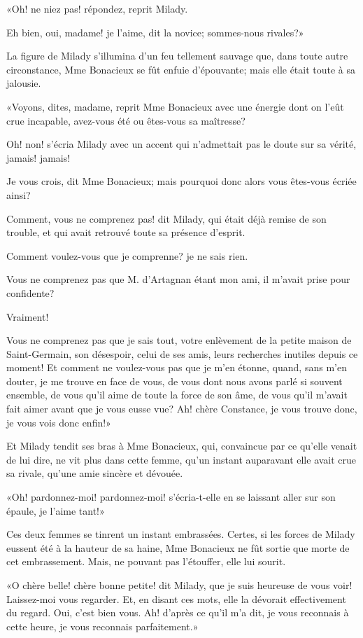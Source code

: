 «Oh! ne niez pas! répondez, reprit Milady. 

\speak  Eh bien, oui, madame! je l'aime, dit la novice; sommes-nous rivales?» 

La figure de Milady s'illumina d'un feu tellement sauvage que, dans toute autre circonstance, Mme Bonacieux se fût enfuie d'épouvante; mais elle était toute à sa jalousie. 

«Voyons, dites, madame, reprit Mme Bonacieux avec une énergie dont on l'eût crue incapable, avez-vous été ou êtes-vous sa maîtresse? 

\speak  Oh! non! s'écria Milady avec un accent qui n'admettait pas le doute sur sa vérité, jamais! jamais! 

\speak  Je vous crois, dit Mme Bonacieux; mais pourquoi donc alors vous êtes-vous écriée ainsi? 

\speak  Comment, vous ne comprenez pas! dit Milady, qui était déjà remise de son trouble, et qui avait retrouvé toute sa présence d'esprit. 

\speak  Comment voulez-vous que je comprenne? je ne sais rien. 

\speak  Vous ne comprenez pas que M. d'Artagnan étant mon ami, il m'avait prise pour confidente? 

\speak  Vraiment! 

\speak  Vous ne comprenez pas que je sais tout, votre enlèvement de la petite maison de Saint-Germain, son désespoir, celui de ses amis, leurs recherches inutiles depuis ce moment! Et comment ne voulez-vous pas que je m'en étonne, quand, sans m'en douter, je me trouve en face de vous, de vous dont nous avons parlé si souvent ensemble, de vous qu'il aime de toute la force de son âme, de vous qu'il m'avait fait aimer avant que je vous eusse vue? Ah! chère Constance, je vous trouve donc, je vous vois donc enfin!» 

Et Milady tendit ses bras à Mme Bonacieux, qui, convaincue par ce qu'elle venait de lui dire, ne vit plus dans cette femme, qu'un instant auparavant elle avait crue sa rivale, qu'une amie sincère et dévouée. 

«Oh! pardonnez-moi! pardonnez-moi! s'écria-t-elle en se laissant aller sur son épaule, je l'aime tant!» 

Ces deux femmes se tinrent un instant embrassées. Certes, si les forces de Milady eussent été à la hauteur de sa haine, Mme Bonacieux ne fût sortie que morte de cet embrassement. Mais, ne pouvant pas l'étouffer, elle lui sourit. 

«O chère belle! chère bonne petite! dit Milady, que je suis heureuse de vous voir! Laissez-moi vous regarder. Et, en disant ces mots, elle la dévorait effectivement du regard. Oui, c'est bien vous. Ah! d'après ce qu'il m'a dit, je vous reconnais à cette heure, je vous reconnais parfaitement.» 

